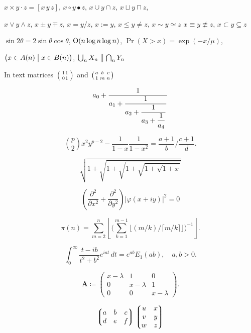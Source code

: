 \documentclass[11pt]{article}
\begin{document}
$x \times y \cdot z = [x\, y\, z]$, \quad $x\circ y \bullet z$, \quad
$x\cup y \cap z$, \quad $x\sqcup y \sqcap z$, \quad

$x \vee y \wedge z$, \quad $x\pm y\mp z$, \quad
$x=y/z$, \quad $x:=y$, \quad $x\le y \ne z$, \quad $x \sim y \simeq z$
$x \equiv y \nequiv z$, \quad $x\subset y \subseteq z$

$\sin2\theta=2\sin\theta\cos\theta$, \quad
$\hbox{O}(n\log n\log n)$, \quad
$\Pr(X>x)=\exp(-x/\mu)$,

$\bigl(x\in A(n)\bigm|x\in B(n)\bigr)$, \quad
$\bigcup_n X_n\bigm\|\bigcap_n Y_n$


In text matrices $\binom{1\,1}{0\,1}$ and $\bigl(\genfrac{}{}{0pt}{}{a}{1}\genfrac{}{}{0pt}{}{b}{m}\genfrac{}{}{0pt}{}{c}{n}\bigr)$


$$a_0+\frac1{\displaystyle a_1 +
{\strut \frac1{\displaystyle a_2 +
{\strut \frac1{\displaystyle a_3 +
{\strut \frac1{\displaystyle a_4}}}}}}}$$


$$\binom{p}{2}x^2y^{p-2} - \frac1{1 - x}\frac{1}{1 - x^2}
=
\frac{a+1}{b}\bigg/\frac{c+1}{d}.$$


$$\sqrt{1+\sqrt{1+\sqrt{1+\sqrt{1+\sqrt{1+x}}}}}$$


$$\left(\frac{\partial^2}{\partial x^2} + \frac{\partial^2}{\partial y^2}\right)
\bigl|\varphi(x+iy)\bigr|^2=0$$



$$\pi(n)=\sum_{m=2}^n\left\lfloor\Biggl(\sum_{k=1}^{m-1}\bigl
\lfloor(m/k)\big/\lceil m/k\rceil\bigr\rfloor\Biggr)^{-1}\right\rfloor.$$


$$\int_0^\infty \frac{t - i b}{t^2 + b^2}e^{iat}\,dt=e^{ab}E_1(ab), \quad
a,b > 0.$$


$$\mathbf{A} \coloneq \begin{pmatrix}x-\lambda&1&0\\
0&x-\lambda&1\\
0&0&x-\lambda\end{pmatrix}.$$

$$\left\lgroup\begin{matrix}a&b&c\\ d&e&f\\\end{matrix}\right\rgroup
\left\lgroup\begin{matrix}u&x\cr v&y\cr w&z\end{matrix}\right\rgroup$$
\end{document}
